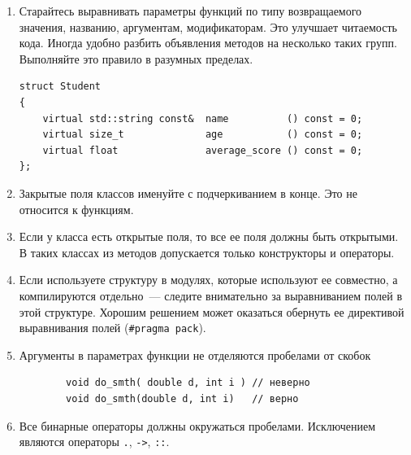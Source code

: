 \documentclass[a4paper,10pt]{article}
\begin{document}
\begin{enumerate}
    \item Старайтесь выравнивать параметры функций по типу возвращаемого
        значения, названию, аргументам, модификаторам. Это улучшает читаемость
        кода. Иногда удобно разбить объявления методов на несколько таких групп.
        Выполняйте это правило в разумных пределах.
\begin{lstlisting}
struct Student
{
    virtual std::string const&  name          () const = 0;
    virtual size_t              age           () const = 0;
    virtual float               average_score () const = 0;
};
\end{lstlisting}
    \item Закрытые поля классов именуйте с подчеркиванием в конце. Это не
        относится к функциям.
    \item Если у класса есть открытые поля, то все ее поля должны быть
        открытыми. В таких классах из методов допускается только конструкторы и
        операторы.
    \item Если используете структуру в модулях, которые используют ее совместно,
        а компилируются отдельно~— следите внимательно за выравниванием полей в
        этой структуре. Хорошим решением может оказаться обернуть ее директивой
        выравнивания полей (\verb!#pragma pack!).  
    \item Аргументы в параметрах функции не отделяются пробелами от скобок
        \begin{lstlisting}
        void do_smth( double d, int i ) // неверно
        void do_smth(double d, int i)   // верно
        \end{lstlisting}
    \item Все бинарные операторы должны окружаться пробелами.
        Исключением являются операторы {\tt .}, {\tt ->}, {\tt ::}.
\end{enumerate}
\end{document}
